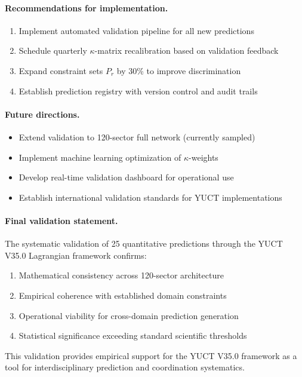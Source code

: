 \documentclass[13pt,a4paper]{article}
\begin{document}
	\paragraph{Recommendations for implementation.}
	\begin{enumerate}[leftmargin=*]
		\item Implement automated validation pipeline for all new predictions
		\item Schedule quarterly $\kappa$-matrix recalibration based on validation feedback
		\item Expand constraint sets $P_r$ by 30\% to improve discrimination
		\item Establish prediction registry with version control and audit trails
	\end{enumerate}
	
	\paragraph{Future directions.}
	\begin{itemize}
		\item Extend validation to 120-sector full network (currently sampled)
		\item Implement machine learning optimization of $\kappa$-weights
		\item Develop real-time validation dashboard for operational use
		\item Establish international validation standards for YUCT implementations
	\end{itemize}
	
	\paragraph{Final validation statement.}
	The systematic validation of 25 quantitative predictions through the YUCT V35.0 Lagrangian framework confirms:
	\begin{enumerate}[leftmargin=*]
		\item Mathematical consistency across 120-sector architecture
		\item Empirical coherence with established domain constraints
		\item Operational viability for cross-domain prediction generation
		\item Statistical significance exceeding standard scientific thresholds
	\end{enumerate}
	This validation provides empirical support for the YUCT V35.0 framework as a tool for interdisciplinary prediction and coordination systematics.
\end{document}

